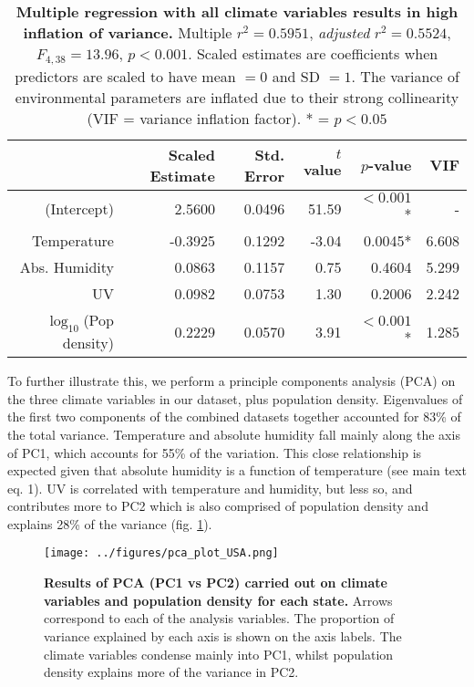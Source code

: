 \documentclass[12pt,english,a4paper]{article}
\begin{document}
\begin{table}[ht]
\centering
\caption{\textbf{Multiple regression with all climate variables results in high inflation of variance.} Multiple $r^2 = 0.5951$, \textsl{adjusted} $r^2 = 0.5524$, $F_{4,38} = 13.96$, $p < 0.001$. Scaled estimates are coefficients when predictors are scaled to have mean $= 0$ and SD $= 1$. The variance of environmental parameters are inflated due to their strong collinearity (VIF = variance inflation factor). * = $p < 0.05$}
\begin{tabular}{rrrrrr}
  \hline
 & Scaled Estimate & Std. Error &  $t$ value & $p$-value & VIF \\ 
  \hline
  (Intercept) & 2.5600 & 0.0496 & 51.59 & $<0.001$* & - \\ 
  Temperature & -0.3925 & 0.1292 & -3.04 & 0.0045* & 6.608 \\ 
  Abs. Humidity & 0.0863 & 0.1157 & 0.75 & 0.4604 & 5.299 \\ 
  UV & 0.0982 & 0.0753 & 1.30 & 0.2006 & 2.242 \\ 
  $\log_{10}$(Pop density) & 0.2229 & 0.0570 & 3.91 & $<0.001$* & 1.285  \\ 
   \hline
\end{tabular}
\label{tab:full_regression}
\end{table}

To further illustrate this, we perform a principle components analysis (PCA) on the three climate variables in our dataset, plus population density. Eigenvalues of the first two components of the combined datasets together accounted for 83\% of the total variance. Temperature and absolute humidity fall mainly along the axis of PC1, which accounts for 55\% of the variation. This close relationship is expected given that absolute humidity is a function of temperature (see main text eq. 1). UV is correlated with temperature and humidity, but less so, and contributes more to PC2 which is also comprised of population density and explains 28\% of the variance (fig. \ref{fig:pca}).

\begin{figure}[ht]
  \centering
  \texttt{[image: ../figures/pca\_plot\_USA.png]}  
  \caption{ {\bf Results of PCA (PC1 vs PC2) carried out on climate variables and population density for each state.} Arrows correspond to each of the analysis variables. The proportion of variance explained by each axis is shown on the axis labels. The climate variables condense mainly into PC1, whilst population density explains more of the variance in PC2.}
\label{fig:pca}
\end{figure}
\end{document}
